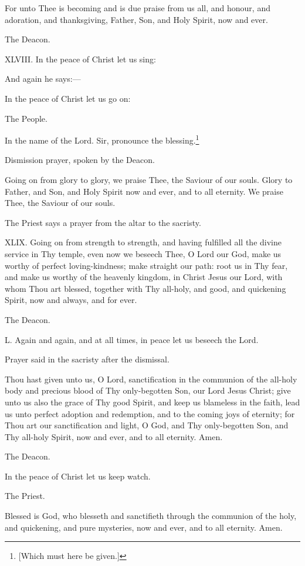 For unto Thee is becoming and is due praise from us all, and honour, and adoration, and thanksgiving, Father, Son, and Holy Spirit, now and ever.

The Deacon.

XLVIII. In the peace of Christ let us sing:

And again he says:—

In the peace of Christ let us go on:

The People.

In the name of the Lord. Sir, pronounce the blessing.\footnote{\par{}  [Which must here be given.]}

Dismission prayer, spoken by the Deacon.

Going on from glory to glory, we praise Thee, the Saviour of our souls. Glory to Father, and Son, and Holy Spirit now and ever, and to all eternity. We praise Thee, the Saviour of our souls.

The Priest says a prayer from the altar to the sacristy.

XLIX. Going on from strength to strength, and having fulfilled all the divine service in Thy temple, even now we beseech Thee, O Lord our God, make us worthy of perfect loving-kindness; make straight our path: root us in Thy fear, and make us worthy of the heavenly kingdom, in Christ Jesus our Lord, with whom Thou art blessed, together with Thy all-holy, and good, and quickening Spirit, now and always, and for ever.

The Deacon.

L. Again and again, and at all times, in peace let us beseech the Lord.

Prayer said in the sacristy after the dismissal.

Thou hast given unto us, O Lord, sanctification in the communion of the all-holy body and precious blood of Thy only-begotten Son, our Lord Jesus Christ; give unto us also the grace of Thy good Spirit, and keep us blameless in the faith, lead us unto perfect adoption and redemption, and to the coming joys of eternity; for Thou art our sanctification and light, O God, and Thy only-begotten Son, and Thy all-holy Spirit, now and ever, and to all eternity. Amen.

The Deacon.

In the peace of Christ let us keep watch.

The Priest.

Blessed is God, who blesseth and sanctifieth through the communion of the holy, and quickening, and pure mysteries, now and ever, and to all eternity. Amen.

